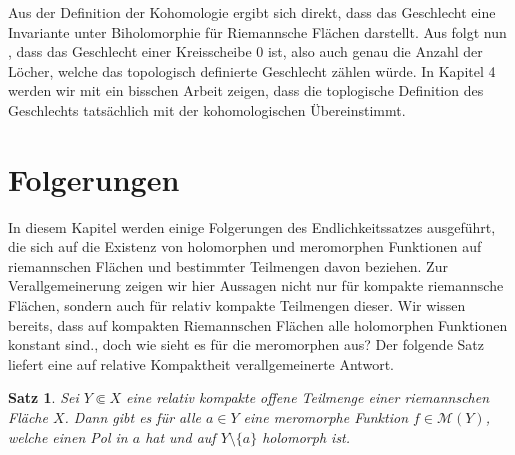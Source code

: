 \documentclass[11pt,a4paper,toc=bibliography]{scrartcl}
\theoremstyle{thm}
\newtheorem{satz}{Satz}[section]
\theoremstyle{def}
\theoremstyle{remark}
\begin{document}
Aus der Definition der Kohomologie ergibt sich direkt, dass das Geschlecht eine Invariante unter Biholomorphie für Riemannsche Flächen darstellt.  Aus  folgt nun , dass das Geschlecht einer Kreisscheibe 0 ist, also auch genau die Anzahl der Löcher, welche das topologisch definierte Geschlecht zählen würde. 
In Kapitel 4 werden wir mit ein bisschen Arbeit zeigen, dass die toplogische Definition des Geschlechts tatsächlich mit der kohomologischen Übereinstimmt. 
\section{Folgerungen}
In diesem Kapitel werden einige Folgerungen des Endlichkeitssatzes ausgeführt, die sich auf die Existenz von holomorphen und meromorphen Funktionen auf riemannschen Flächen und bestimmter Teilmengen davon beziehen.
Zur Verallgemeinerung zeigen wir hier Aussagen nicht nur für kompakte riemannsche Flächen, sondern auch für relativ kompakte Teilmengen dieser.
Wir wissen bereits, dass auf kompakten Riemannschen Flächen alle holomorphen Funktionen konstant sind.\cite[S.10,2.8]{forster}, doch wie sieht es für die meromorphen aus? Der folgende Satz liefert eine auf relative Kompaktheit verallgemeinerte Antwort.
\begin{satz}
Sei $Y\Subset X$ eine relativ kompakte offene Teilmenge einer riemannschen Fläche $X$. Dann gibt es für alle $a\in Y$ eine meromorphe Funktion $f\in \mathcal{M}(Y)$, welche einen Pol in $a$ hat und auf $Y\setminus\{ a \}$ holomorph ist.
\end{satz}
\end{document}
